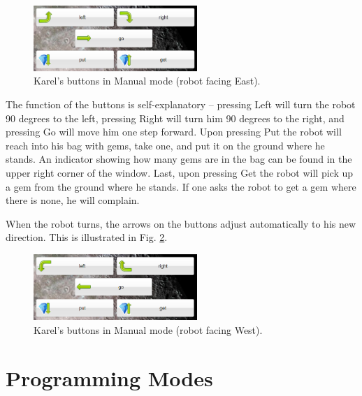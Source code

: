 \begin{figure}[!ht]
\begin{center}
\includegraphics[width=6.2cm]{img/buttons-all.png}
\vspace{-0mm}
\caption{Karel's buttons in Manual mode (robot facing East).}
\label{fig:buttons}
\end{center}
\end{figure}
\noindent
The function of the buttons is self-explanatory -- pressing Left will turn the robot 90 degrees to the left,
pressing Right will turn him 90 degrees to the right, and pressing Go will move him one step forward. 
Upon pressing Put the robot will reach into his bag with gems, 
take one, and put it on the ground where he stands. 
An indicator showing how many gems are in the bag can be found in the upper right 
corner of the window. Last, upon pressing 
Get the robot will pick up a gem from the ground where he stands. If 
one asks the robot to get a gem where there is none, he will complain.

When the robot turns, the arrows on the buttons adjust automatically to his new 
direction. This is illustrated in Fig. \ref{fig:buttons2}.

\begin{figure}[!ht]
\begin{center}
\includegraphics[width=6.2cm]{img/buttons-all-2.png}
\vspace{-0mm}
\caption{Karel's buttons in Manual mode (robot facing West).}
\label{fig:buttons2}
\end{center}
\end{figure}


\section{Programming Modes} \label{sec:bridge}


